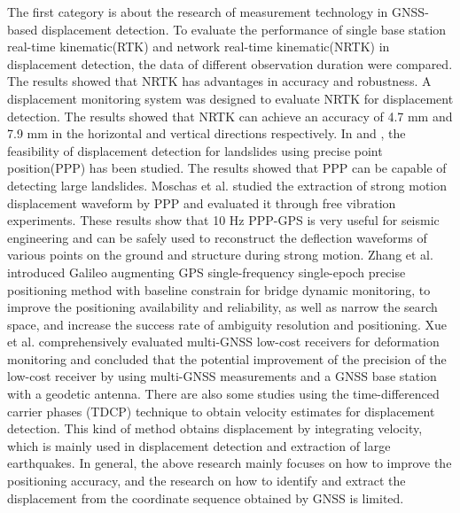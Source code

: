 \documentclass[final,3p,times]{elsarticle}
\begin{document}
	The first category is about the research of measurement technology in GNSS-based displacement detection.
	To evaluate the performance of single base station \textcolor{r_s}{real-time} kinematic(RTK) and network \textcolor{r_s}{real-time} kinematic(NRTK) in displacement detection, the data of different observation duration were compared\cite{wang2011gps}. The results showed that NRTK has advantages in accuracy and robustness.
	A displacement monitoring system was designed to evaluate NRTK for displacement detection\cite{GUMUS2019131}. The results showed that NRTK can achieve an accuracy of 4.7 mm and 7.9 mm in the horizontal and vertical directions respectively.
	In \cite{csanliouglu2016landslide} and \cite{lytvyn2012real}, the feasibility of displacement detection for landslides  using precise point position(PPP) has been studied. The results showed that PPP can be capable of detecting large landslides.
	\textcolor{r_s}{
		Moschas et al.\cite{Moschas_2014} studied the extraction of strong motion displacement waveform by PPP and evaluated it through free vibration experiments. These results show that 10 Hz PPP-GPS is very useful for seismic engineering and can be safely used to reconstruct the deflection waveforms of various points on the ground and structure during strong motion.}
	\textcolor{r_s}{Zhang et al.\cite{Meng_2019} introduced Galileo augmenting GPS single-frequency single-epoch precise positioning method with baseline constrain for bridge dynamic monitoring, to improve the positioning availability and reliability, as well as narrow the search space, and increase the success rate of ambiguity resolution and positioning.
	Xue et al.\cite{Xue2021} comprehensively evaluated multi-GNSS low-cost receivers for deformation monitoring and concluded that the potential improvement of the precision of the low-cost receiver by using multi-GNSS measurements and a GNSS base station with a geodetic antenna.}
	There are also some studies using the time-differenced carrier phases (TDCP) technique\cite{freda2015time,colosimo2011real} to obtain velocity estimates for displacement detection. This kind of method obtains displacement by integrating velocity, which is mainly used in displacement detection and extraction of large earthquakes.
	In general, the above research mainly focuses on how to improve the positioning accuracy, and the research on how to identify and extract the displacement from the coordinate sequence obtained by GNSS is limited.
	
\end{document}
